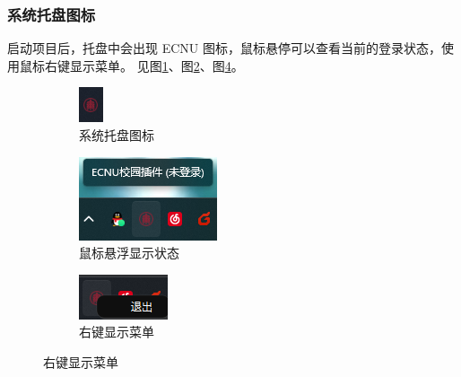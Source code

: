 \subsubsection{系统托盘图标}

启动项目后，托盘中会出现 ECNU 图标，鼠标悬停可以查看当前的登录状态，使用鼠标右键显示菜单。
见图\ref{fig:tray-icon}、图\ref{fig:tray-icon-hover}、图\ref{fig:tray-icon-menu}。

\begin{figure}[H]
    \centering
    \begin{subfigure}[b]{0.3\textwidth}
        \centering
        \includegraphics{img/tray_icon}
        \caption{系统托盘图标}
        \label{fig:tray-icon}
    \end{subfigure}
    \hspace{0.06\textwidth}
    \begin{subfigure}[b]{0.3\textwidth}
        \centering
        \includegraphics{img/tray_icon_hover}
        \caption{鼠标悬浮显示状态}
        \label{fig:tray-icon-hover}
    \end{subfigure}
    \begin{subfigure}[b]{0.3\textwidth}
        \centering
        \includegraphics{img/tray_icon_menu}
        \caption{右键显示菜单}
        \label{fig:tray-icon-menu}
    \end{subfigure}
\end{figure}

